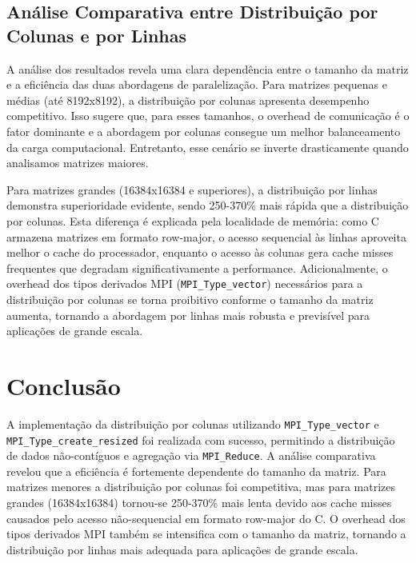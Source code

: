 \documentclass[a4paper, 12pt]{article}
\begin{document}
	\subsection{Análise Comparativa entre Distribuição por Colunas e por Linhas}
	A análise dos resultados revela uma clara dependência entre o tamanho da matriz e a eficiência das duas abordagens de paralelização. Para matrizes pequenas e médias (até 8192x8192), a distribuição por colunas apresenta desempenho competitivo. Isso sugere que, para esses tamanhos, o overhead de comunicação é o fator dominante e a abordagem por colunas consegue um melhor balanceamento da carga computacional. Entretanto, esse cenário se inverte drasticamente quando analisamos matrizes maiores.
	
	Para matrizes grandes (16384x16384 e superiores), a distribuição por linhas demonstra superioridade evidente, sendo 250-370\% mais rápida que a distribuição por colunas. Esta diferença é explicada pela localidade de memória: como C armazena matrizes em formato row-major, o acesso sequencial às linhas aproveita melhor o cache do processador, enquanto o acesso às colunas gera cache misses frequentes que degradam significativamente a performance. Adicionalmente, o overhead dos tipos derivados MPI (\texttt{MPI\_Type\_vector}) necessários para a distribuição por colunas se torna proibitivo conforme o tamanho da matriz aumenta, tornando a abordagem por linhas mais robusta e previsível para aplicações de grande escala.
	
	\section{Conclusão}
	\hspace{0.62cm}A implementação da distribuição por colunas utilizando \texttt{MPI\_Type\_vector} e \texttt{MPI\_Type\_create\_resized} foi realizada com sucesso, permitindo a distribuição de dados não-contíguos e agregação via \texttt{MPI\_Reduce}.
	A análise comparativa revelou que a eficiência é fortemente dependente do tamanho da matriz. Para matrizes menores a distribuição por colunas foi competitiva, mas para matrizes grandes (16384x16384) tornou-se 250-370\% mais lenta devido aos cache misses causados pelo acesso não-sequencial em formato row-major do C. O overhead dos tipos derivados MPI também se intensifica com o tamanho da matriz, tornando a distribuição por linhas mais adequada para aplicações de grande escala.
	
\end{document}
